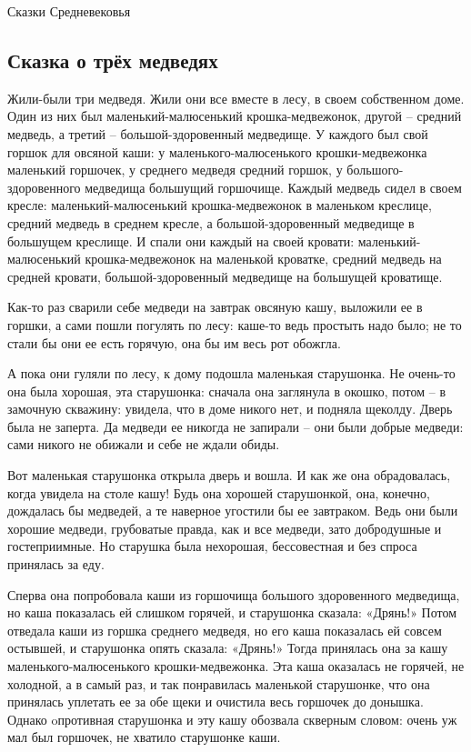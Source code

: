 




\begin{center}
    {
        \textcolor{bordercol}{\fontsize{36pt}{40pt}\selectfont Сказки Средневековья}
    }
\end{center}

\subsection*{Сказка о трёх медведях}

Жили-были три медведя. Жили они все вместе в лесу, в своем собственном доме. Один из них был маленький-малюсенький крошка-медвежонок, другой – средний медведь, а третий – большой-здоровенный медведище. У каждого был свой горшок для овсяной каши: у маленького-малюсенького крошки-медвежонка маленький горшочек, у среднего медведя средний горшок, у большого-здоровенного медведища большущий горшочище. Каждый медведь сидел в своем кресле: маленький-малюсенький крошка-медвежонок в маленьком креслице, средний медведь в среднем кресле, а большой-здоровенный медведище в большущем креслище. И спали они каждый на своей кровати: маленький-малюсенький крошка-медвежонок на маленькой кроватке, средний медведь на средней кровати, большой-здоровенный медведище на большущей кроватище.

Как-то раз сварили себе медведи на завтрак овсяную кашу, выложили ее в горшки, а сами пошли погулять по лесу: каше-то ведь простыть надо было; не то стали бы они ее есть горячую, она бы им весь рот обожгла.

А пока они гуляли по лесу, к дому подошла маленькая старушонка. Не очень-то она была хорошая, эта старушонка: сначала она заглянула в окошко, потом – в замочную скважину: увидела, что в доме никого нет, и подняла щеколду. Дверь была не заперта. Да медведи ее никогда не запирали – они были добрые медведи: сами никого не обижали и себе не ждали обиды.

Вот маленькая старушонка открыла дверь и вошла. И как же она обрадовалась, когда увидела на столе кашу! Будь она хорошей старушонкой, она, конечно, дождалась бы медведей, а те наверное угостили бы ее завтраком. Ведь они были хорошие медведи, грубоватые правда, как и все медведи, зато добродушные и гостеприимные. Но старушка была нехорошая, бессовестная и без спроса принялась за еду.

Сперва она попробовала каши из горшочища большого здоровенного медведища, но каша показалась ей слишком горячей, и старушонка сказала: «Дрянь!» Потом отведала каши из горшка среднего медведя, но его каша показалась ей совсем остывшей, и старушонка опять сказала: «Дрянь!» Тогда принялась она за кашу маленького-малюсенького крошки-медвежонка. Эта каша оказалась не горячей, не холодной, а в самый раз, и так понравилась маленькой старушонке, что она принялась уплетать ее за обе щеки и очистила весь горшочек до донышка. Однако oпротивная старушонка и эту кашу обозвала скверным словом: очень уж мал был горшочек, не хватило старушонке каши.

